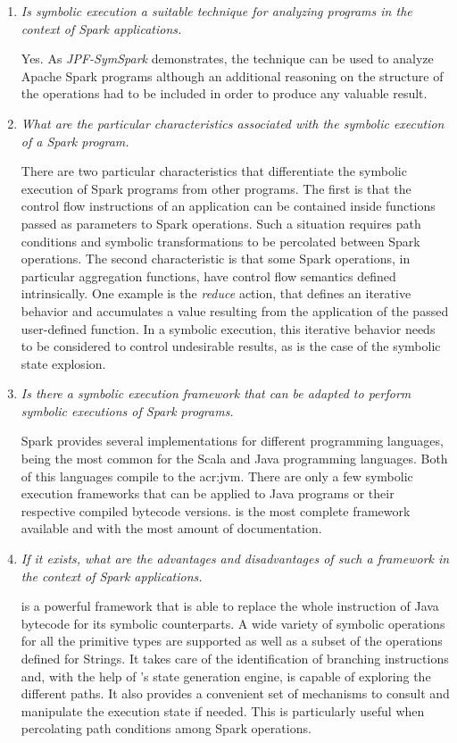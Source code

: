 \begin{enumerate}
	\item \textit{Is symbolic execution a suitable technique for analyzing programs in the context of Spark applications.} 
	
	Yes. As \textit{JPF-SymSpark} demonstrates, the technique can be used to analyze Apache Spark programs although an additional reasoning on the structure of the operations had to be included in order to produce any valuable result.
	
	\item \textit{What are the particular characteristics associated with the symbolic execution of a Spark program.}
	
	There are two particular characteristics that differentiate the symbolic execution of Spark programs from other programs. The first is that the control flow instructions of an application can be contained inside functions passed as parameters to Spark operations. Such a situation requires path conditions and symbolic transformations to be percolated between Spark operations. The second characteristic is that some Spark operations, in particular aggregation functions, have control flow semantics defined intrinsically. One example is the \textit{reduce} action, that defines an iterative behavior and accumulates a value resulting from the application of the passed user-defined function. In a symbolic execution, this iterative behavior needs to be considered to control undesirable results, as is the case of the symbolic state explosion.
	
	\item \textit{Is there a symbolic execution framework that can be adapted to perform symbolic executions of Spark programs.}
	
	Spark provides several implementations for different programming languages, being the most common for the Scala and Java programming languages. Both of this languages compile to the \acrlong{acr:jvm}. There are only a few symbolic execution frameworks that can be applied to Java programs or their respective compiled bytecode versions. \spf{} is the most complete framework available and with the most amount of documentation.
	
	\item \textit{If it exists, what are the advantages and disadvantages of such a framework in the context of Spark applications.}
	
	\spf{} is a powerful framework that is able to replace the whole instruction of Java bytecode for its symbolic counterparts. A wide variety of symbolic operations for all the primitive types are supported as well as a subset of the operations defined for Strings. It takes care of the identification of branching instructions and, with the help of \jpf{}'s state generation engine, is capable of exploring the different paths. It also provides a convenient set of mechanisms to consult and manipulate the execution state if needed. This is particularly useful when percolating path conditions among Spark operations. 
	

\end{enumerate}
